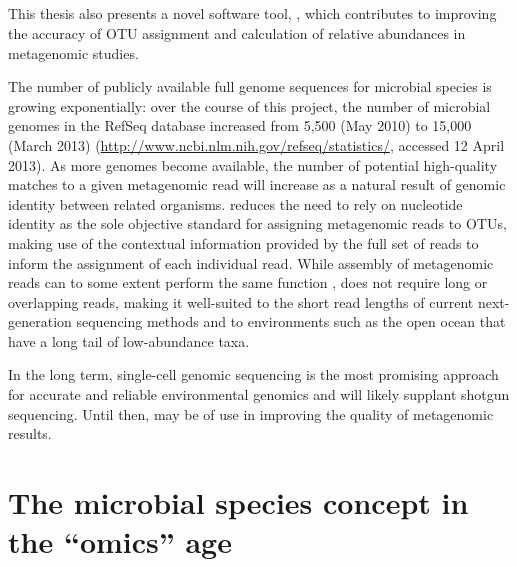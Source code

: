 \subsection{}

This thesis also presents a novel software tool, , which contributes to improving the accuracy of \ac{OTU} assignment and calculation of relative abundances in metagenomic studies.

The number of publicly available full genome sequences for microbial species is growing exponentially: over the course of this project, the number of microbial genomes in the RefSeq database increased from 5,500 (May 2010) to 15,000 (March 2013) (\url{http://www.ncbi.nlm.nih.gov/refseq/statistics/}, accessed 12 April 2013).
As more genomes become available, the number of potential high-quality matches to a given metagenomic read will increase as a natural result of genomic identity between related organisms.
 reduces the need to rely on nucleotide identity as the sole objective standard for assigning metagenomic reads to \acp{OTU}, making use of the contextual information provided by the full set of reads to inform the assignment of each individual read.
While assembly of metagenomic reads can to some extent perform the same function \cite{Temperton:2012fj},  does not require long or overlapping reads, making it well-suited to the short read lengths of current next-generation sequencing methods and to environments such as the open ocean that have a long tail of low-abundance taxa.

In the long term, single-cell genomic sequencing is the most promising approach for accurate and reliable environmental genomics \cite{Blainey:2013dp} and will likely supplant shotgun sequencing.
Until then,  may be of use in improving the quality of metagenomic results.

\section{The microbial species concept in the ``omics'' age}

